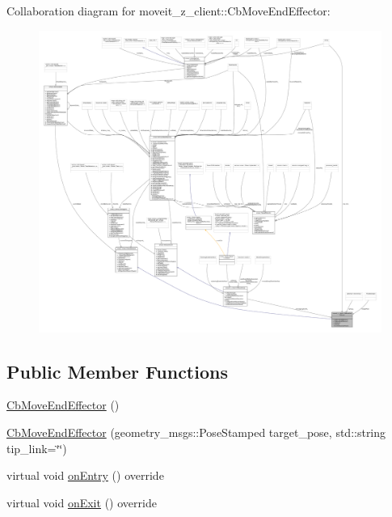 Collaboration diagram for moveit\+\_\+z\+\_\+client\+:\+:Cb\+Move\+End\+Effector\+:
\nopagebreak
\begin{figure}[H]
\begin{center}
\leavevmode
\includegraphics[width=350pt]{classmoveit__z__client_1_1CbMoveEndEffector__coll__graph}
\end{center}
\end{figure}
\subsection*{Public Member Functions}
\begin{DoxyCompactItemize}
\item 
\hyperlink{classmoveit__z__client_1_1CbMoveEndEffector_acd25310b5088e3eeaa75220d283546e8}{Cb\+Move\+End\+Effector} ()
\item 
\hyperlink{classmoveit__z__client_1_1CbMoveEndEffector_a688d63425a7a67c3f26d1ae90733ccb1}{Cb\+Move\+End\+Effector} (geometry\+\_\+msgs\+::\+Pose\+Stamped target\+\_\+pose, std\+::string tip\+\_\+link=\char`\"{}\char`\"{})
\item 
virtual void \hyperlink{classmoveit__z__client_1_1CbMoveEndEffector_a5306018b432c9d8f8a31823f6b317d84}{on\+Entry} () override
\item 
virtual void \hyperlink{classmoveit__z__client_1_1CbMoveEndEffector_af3fdc6c596da7792cfc9bbef13cb02fc}{on\+Exit} () override
\end{DoxyCompactItemize}

